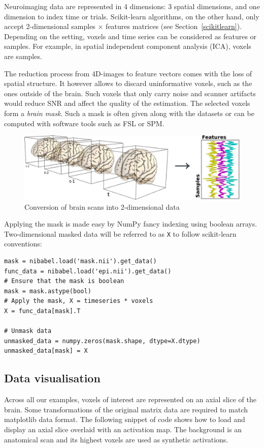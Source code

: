 \documentclass{frontiersSCNS} %
\begin{document}
Neuroimaging data are represented in 4 dimensions: 3 spatial dimensions, and 
one dimension to index time or trials.
Scikit-learn algorithms, on the other hand, only accept 2-dimensional
samples $\times$ features matrices (see Section~\ref{scikitlearn}).
Depending on the setting, voxels and time series can be
considered as features
or samples. For example, in spatial independent component analysis (ICA),
voxels are samples.


The reduction process from 4D-images to feature vectors comes with the loss
of spatial structure. It however allows to discard uninformative
voxels, such as the ones outside of the brain. Such voxels that
only carry noise and scanner artifacts would reduce SNR and affect the
quality of the estimation. The selected voxels form a \emph{brain mask}.
Such a mask is often given along with the datasets or can be computed
with software tools such as FSL or SPM.

\begin{figure}[hbtp]
    \begin{center}
        \includegraphics[width=.5\linewidth]{niimgs.jpg}
    \end{center}
    \caption{Conversion of brain scans into 2-dimensional data}
    \label{fig:niimg}
\end{figure}

Applying the mask is made easy by NumPy fancy indexing using boolean arrays.
Two-dimensional masked data will be referred to as \texttt{X} to follow
scikit-learn conventions:
\begin{lstlisting}
mask = nibabel.load('mask.nii').get_data()
func_data = nibabel.load('epi.nii').get_data()
# Ensure that the mask is boolean
mask = mask.astype(bool)
# Apply the mask, X = timeseries * voxels
X = func_data[mask].T

# Unmask data
unmasked_data = numpy.zeros(mask.shape, dtype=X.dtype)
unmasked_data[mask] = X
\end{lstlisting}

\subsection{Data visualisation}

Across all our examples, voxels of interest are represented on an axial slice of
the brain. Some transformations of the original matrix data are required to match
matplotlib data format. The following snippet of code shows how to load and
display an axial slice overlaid with an activation map. The background is an
anatomical scan and its highest voxels are used as synthetic
activations.
\end{document}
